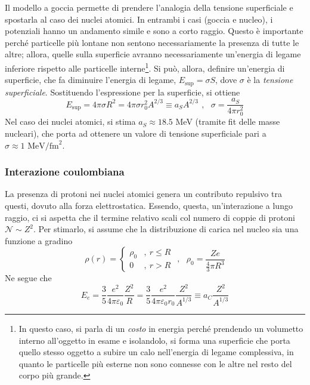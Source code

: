\documentclass[11pt, a4paper]{scrartcl}
\theoremstyle{style}
\numberwithin{equation}{subsection}
\begin{document}
Il modello a goccia permette di prendere l'analogia della tensione superficiale e spostarla al caso dei nuclei atomici. 
In entrambi i casi (goccia e nucleo), i potenziali hanno un andamento simile e sono a corto raggio.
Questo \`e importante perch\'e particelle pi\`u lontane non sentono necessariamente la presenza di tutte le altre; allora, quelle sulla superficie avranno necessariamente un'energia di legame inferiore rispetto alle particelle interne\footnote{In questo caso, si parla di un \textit{costo} in energia perch\'e prendendo un volumetto interno all'oggetto in esame e isolandolo, si forma una superficie che porta quello stesso oggetto a subire un calo nell'energia di legame complessiva, in quanto le particelle pi\`u esterne non sono connesse con le altre nel resto del corpo pi\`u grande.}.
Si pu\`o, allora, definire un'energia di superficie, che fa diminuire l'energia di legame, $E_\text{sup} = \sigma S$, dove $\sigma $ \`e la \textit{tensione superficiale}.
Sostituendo l'espressione per la superficie, si ottiene
\begin{equation}
E_\text{sup} = 4\pi \sigma  R^2 = 4 \pi \sigma r_0^2 A^{2 / 3} \equiv a_S A^{2 / 3} \ \, , \ \ \ \sigma  = \frac{a_S}{4 \pi r_0^2}
\end{equation}
Nel caso dei nuclei atomici, si stima $a_S \approx 18.5$ MeV (tramite fit delle masse nucleari), che porta ad ottenere un valore di tensione superficiale pari a $\sigma \approx 1 \text{ MeV}/\text{fm}^2$.

\subsubsection{Interazione coulombiana}
La presenza di protoni nei nuclei atomici genera un contributo repulsivo tra questi, dovuto alla forza elettrostatica.
Essendo, questa, un'interazione a lungo raggio, ci si aspetta che il termine relativo scali col numero di coppie di protoni $\mathcal{N} \sim Z^2$.
Per stimarlo, si assume che la distribuzione di carica nel nucleo sia una funzione a gradino 
\[
\rho (r) = \begin{cases}
	\rho _0 &,\ r \le R\\
	0 &,\ r > R
\end{cases} \ \, , \ \ \ \rho _0 = \frac{Ze}{\frac{4}{3} \pi R^3}
\] 
Ne segue che 
\begin{equation}
	E_e = \frac{3}{5} \frac{e^2}{4 \pi \varepsilon _0} \frac{Z^2}{R} = \frac{3}{5} \frac{e^2}{4\pi \varepsilon _0 r_0} \frac{Z^2}{A^{1 / 3}} \equiv a_C \frac{Z^2}{A^{1 / 3}}
\end{equation}
\end{document}
